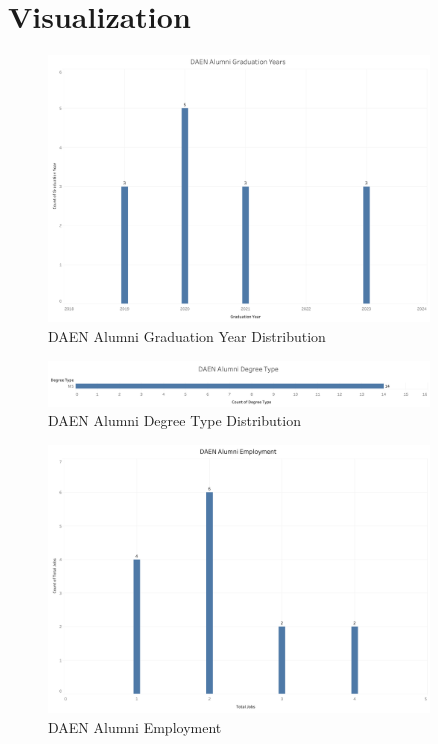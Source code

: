 \documentclass[12pt,a4paper]{article}
\begin{document}
\section{Visualization}
\begin{figure}[H]
    \centering
    \includegraphics[width=0.9\textwidth]{visualizations/graduation-year.png}
    \caption{DAEN Alumni Graduation Year Distribution}
    \label{fig:graudation-year}
\end{figure}
\begin{figure}[H]
    \centering
    \includegraphics[width=0.9\textwidth]{visualizations/degree-type.png}
    \caption{DAEN Alumni Degree Type Distribution}
    \label{fig:degree-type}
\end{figure}

\begin{figure}[H]
    \centering
    \includegraphics[width=0.9\textwidth]{visualizations/total-jobs.png}
    \caption{DAEN Alumni Employment}
    \label{fig:total-jobs}
\end{figure}
\end{document}
